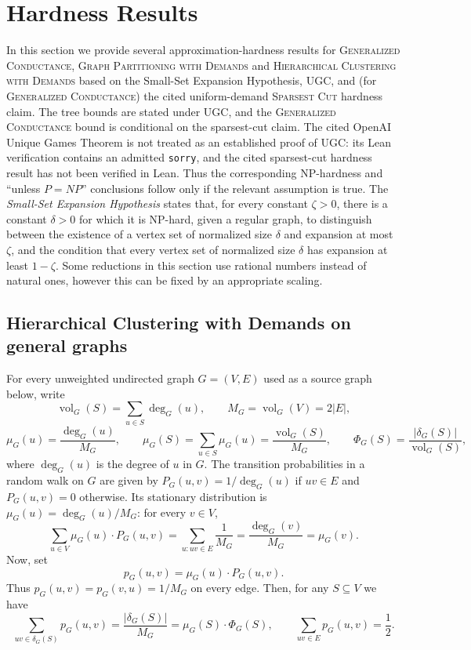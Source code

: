 \section{Hardness Results}\label{sec:gpd-hardness}

In this section we provide several approximation-hardness results for \textsc{Generalized Conductance}, \textsc{Graph Partitioning with Demands} and \textsc{Hierarchical Clustering with Demands} based on the Small-Set Expansion Hypothesis, UGC, and (for \textsc{Generalized Conductance}) the cited uniform-demand \textsc{Sparsest Cut} hardness claim. The tree bounds are stated under UGC, and the \textsc{Generalized Conductance} bound is conditional on the sparsest-cut claim. The cited OpenAI Unique Games Theorem is not treated as an established proof of UGC: its Lean verification contains an admitted \texttt{sorry}, and the cited sparsest-cut hardness result has not been verified in Lean. Thus the corresponding NP-hardness and ``unless $P=NP$'' conclusions follow only if the relevant assumption is true. The \emph{Small-Set Expansion Hypothesis} states that, for every constant $\zeta>0$, there is a constant $\delta>0$ for which it is NP-hard, given a regular graph, to distinguish between the existence of a vertex set of normalized size $\delta$ and expansion at most $\zeta$, and the condition that every vertex set of normalized size $\delta$ has expansion at least $1-\zeta$. Some reductions in this section use rational numbers instead of natural ones, however this can be fixed by an appropriate scaling.

\subsection{Hierarchical Clustering with Demands on general graphs}
For every unweighted undirected graph $G=(V,E)$ used as a source graph below, write
\[
    \operatorname{vol}_G(S)=\sum_{u\in S}\deg_G(u),
    \qquad
    M_G=\operatorname{vol}_G(V)=2|E|,
\]
\[
    \mu_G(u)=\frac{\deg_G(u)}{M_G},
    \qquad
    \mu_G(S)=\sum_{u\in S}\mu_G(u)=\frac{\operatorname{vol}_G(S)}{M_G},\qquad
    \Phi_G(S)=\frac{|\delta_G(S)|}{\operatorname{vol}_G(S)},
\]
where $\deg_G(u)$ is the degree of $u$ in $G$.
The transition probabilities in a random walk on $G$ are given by $P_G(u,v)=1/\deg_G(u)$ if $uv\in E$ and $P_G(u,v)=0$ otherwise. Its stationary distribution is $\mu_G(u)=\deg_G(u)/M_G$: for every $v\in V$,
\[
    \sum_{u\in V}\mu_G(u)\cdot P_G(u,v)
    =\sum_{u\colon uv\in E}\frac{1}{M_G}
    =\frac{\deg_G(v)}{M_G}
    =\mu_G(v).
\]
Now, set
\[
    p_G(u,v)=\mu_G(u)\cdot P_G(u,v).
\]
Thus $p_G(u,v)=p_G(v,u)=1/M_G$ on every edge. Then, for any $S\subseteq V$ we have
\[
    \sum_{uv\in\delta_G(S)}p_G(u,v)
    =\frac{|\delta_G(S)|}{M_G}
    =\mu_G(S)\cdot \Phi_G(S),
    \qquad
    \sum_{uv\in E}p_G(u,v)=\frac12.
\]

